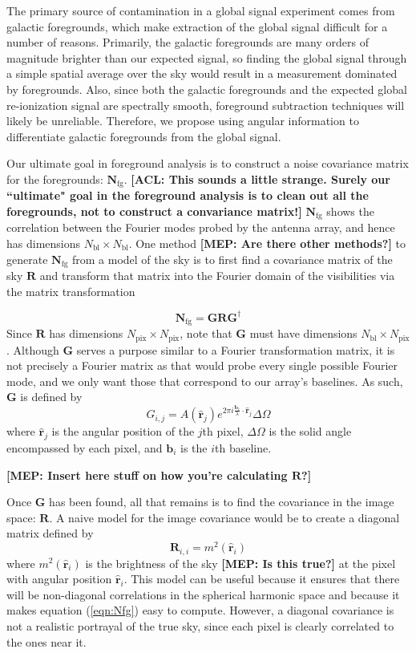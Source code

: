 \documentclass[twolcolumn,apj]{emulateapj}
\newcommand{\Nfg}{\mathbf{N}_{\textrm{fg}}}
\newcommand{\R}{\mathbf{R}}
\newcommand{\rhat}{\hat{\mathbf{r}}}
\newcommand{\Nbl}{N_{\textrm{bl}}}
\newcommand{\acl}[1]{{\color{red} \textbf{[ACL:  #1]}}}
\newcommand{\mep}[1]{{\color{applegreen} \textbf{[MEP:  #1]}}}
\begin{document}
The primary source of contamination in a global signal experiment comes from galactic foregrounds, which make extraction of the global signal difficult for a number of reasons. Primarily, the galactic foregrounds are many orders of magnitude brighter than our expected signal, so finding the global signal through a simple spatial average over the sky would result in a measurement dominated by foregrounds. Also, since both the galactic foregrounds and the expected global re-ionization signal are spectrally smooth, foreground subtraction techniques will likely be unreliable. Therefore, we propose using angular information to differentiate galactic foregrounds from the global signal. 

Our ultimate goal in foreground analysis is to construct a noise covariance matrix for the foregrounds: $\Nfg$. \acl{This sounds a little strange.  Surely our ``ultimate" goal in the foreground analysis is to clean out all the foregrounds, not to construct a convariance matrix!} $\Nfg$  shows the correlation between the Fourier modes probed by the antenna array, and hence has dimensions $\Nbl \times \Nbl$. One method \mep{Are there other methods?} to generate $\Nfg$ from a model of the sky is to first find a covariance matrix of the sky $\R$ and transform that matrix into the Fourier domain of the visibilities via the matrix transformation 

\begin{equation}
\Nfg = \mathbf{G} \R \mathbf{G}^\dagger
\label{eqn:Nfg}
\end{equation}
Since $\R$ has dimensions $N_{\textrm{pix}} \times N_{\textrm{pix}}$, note that $\mathbf{G}$ must have dimensions $\Nbl \times N_{\textrm{pix}}$. Although $\mathbf{G}$ serves a purpose similar to a Fourier transformation matrix, it is not precisely a Fourier matrix as that would probe every single possible Fourier mode, and we only want those that correspond to our array's baselines. As such, $\mathbf{G}$ is defined by 
\begin{equation}
G_{i,j} = A(\rhat_j)e^{2\pi i \frac{\mathbf{b_\textit{i}}}{\lambda} \cdot \boldsymbol \rhat_j} \Delta \Omega
\end{equation}
where $\rhat_j$ is the angular position of the $j$th pixel,  $\Delta \Omega$ is the solid angle encompassed by each pixel, and $\mathbf{b_\textit{i}}$ is the $i$th baseline. 

\mep{Insert here stuff on how you're calculating $\R$?}

Once $\mathbf{G}$ has been found, all that remains is to find the covariance in the image space: $\R$. A naive model for the image covariance would be to create a diagonal matrix defined by 
\begin{equation}
\R_{i,i} = m^2(\rhat_i)
\end{equation}
where $m^2(\rhat_i)$ is the brightness of the sky \mep{Is this true?} at the pixel with angular position $\rhat_i$. This model can be useful because it ensures that there will be non-diagonal correlations in the spherical harmonic space and because it makes equation (\ref{eqn:Nfg}) easy to compute. However, a diagonal covariance is not a realistic portrayal of the true sky, since each pixel is clearly correlated to the ones near it. 
\end{document}
